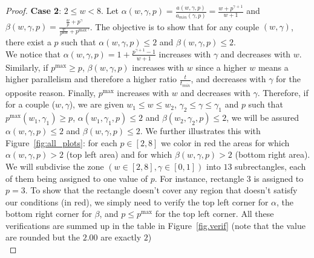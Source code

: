 \documentclass{article}
\begin{document}
\begin{proof}
\textbf{Case 2}: $2 \leq w<8$. 
Let  $\alpha(w,\gamma,p)= \frac{a(w,\gamma,p)}{a_{min}(\gamma,p)}=\frac{w+p^{\gamma+1}}{w+1}$ and $\beta(w,\gamma,p)= \frac{\frac{w}{p}+p^\gamma}{\frac{w}{p^{\max}}+{p^{\max}}^\gamma}$. The objective is to show that for any couple $(w,\gamma)$, there exist a $p$ such that $\alpha(w,\gamma,p)\leq 2$ and $\beta(w,\gamma,p)\leq 2$.\\

We notice that $\alpha(w,\gamma,p)=1+\frac{p^{\gamma+1}-1}{w+1}$ increases with $\gamma$ and decreases with $w$. Similarly, if $p^{\max} \geq p$, $\beta(w,\gamma,p)$ increases with $w$ since a higher $w$ means a higher parallelism and therefore a higher ratio $\frac{t}{t_{min}}$, and decreases with $\gamma$ for the opposite reason. Finally, $p^{\max}$ increases with $w$ and decreases with $\gamma$. Therefore, if for a couple ($w,\gamma$), we are given $w_1 \leq w \leq w_2$, $\gamma_2 \leq \gamma \leq \gamma_1$ and $p$ such that $p^{\max}(w_1,\gamma_1) \geq p $, $\alpha(w_1,\gamma_1,p) \leq 2$ and $\beta(w_2,\gamma_2,p) \leq 2$, we will be assured $\alpha(w,\gamma,p) \leq 2$ and $\beta(w,\gamma,p) \leq 2$. We further illustrates this with Figure~\ref{fig:all_plots}: for each $p \in [2,8]$ we color in red the areas for which $\alpha(w,\gamma,p) > 2$ (top left area) and for which $\beta(w,\gamma,p) > 2$ (bottom right area). We will subdivise the zone $(w \in [2,8], \gamma \in [0,1])$ into $13$ subrectangles, each of them being assigned to one value of $p$. For instance, rectangle $3$ is assigned to $p=3$. To show that the rectangle doesn't cover any region that doesn't satisfy our conditions (in red), we simply need to verify the top left corner for $\alpha$, the bottom right corner for $\beta$, and $p \leq p^{\max}$ for the top left corner. All these verifications are summed up in the table in Figure~\ref{fig.verif} (note that the value are rounded but the $2.00$ are exactly $2$)\\




\end{proof}
\end{document}
